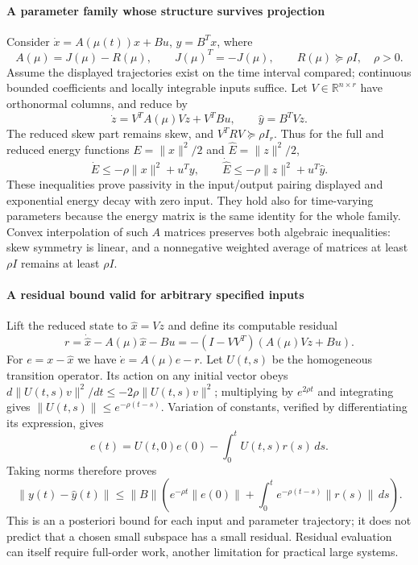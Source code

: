 \documentclass[11pt]{article}
\begin{document}
\paragraph{A parameter family whose structure survives projection}
Consider $\dot x=A(\mu(t))x+Bu$, $y=B^Tx$, where
\[
 A(\mu)=J(\mu)-R(\mu),\qquad J(\mu)^T=-J(\mu),\qquad R(\mu)\succeq\rho I,
 \quad\rho>0.
\]
Assume the displayed trajectories exist on the time interval compared; continuous bounded coefficients and locally integrable inputs suffice. Let $V\in\mathbb R^{n\times r}$ have orthonormal columns, and reduce by
\[
 \dot z=V^TA(\mu)Vz+V^TBu,\qquad \widehat y=B^TVz.
\]
The reduced skew part remains skew, and $V^TRV\succeq\rho I_r$. Thus for the full and reduced energy functions $E=\lVert x\rVert^2/2$ and $\widehat E=\lVert z\rVert^2/2$,
\[
 \dot E\leq-\rho\lVert x\rVert^2+u^Ty,
 \qquad \dot{\widehat E}\leq-\rho\lVert z\rVert^2+u^T\widehat y.
\]
These inequalities prove passivity in the input/output pairing displayed and exponential energy decay with zero input. They hold also for time-varying parameters because the energy matrix is the same identity for the whole family. Convex interpolation of such $A$ matrices preserves both algebraic inequalities: skew symmetry is linear, and a nonnegative weighted average of matrices at least $\rho I$ remains at least $\rho I$.

\paragraph{A residual bound valid for arbitrary specified inputs}
Lift the reduced state to $\widehat x=Vz$ and define its computable residual
\[
 r=\dot{\widehat x}-A(\mu)\widehat x-Bu
   =-(I-VV^T)(A(\mu)Vz+Bu).
\]
For $e=x-\widehat x$ we have $\dot e=A(\mu)e-r$. Let $U(t,s)$ be the homogeneous transition operator. Its action on any initial vector obeys
$d\lVert U(t,s)v\rVert^2/dt\leq-2\rho\lVert U(t,s)v\rVert^2$;
multiplying by $e^{2\rho t}$ and integrating gives $\lVert U(t,s)\rVert\leq e^{-\rho(t-s)}$. Variation of constants, verified by differentiating its expression, gives
\[
 e(t)=U(t,0)e(0)-\int_0^tU(t,s)r(s)\,ds.
\]
Taking norms therefore proves
\[
 \lVert y(t)-\widehat y(t)\rVert
 \leq\lVert B\rVert\left(e^{-\rho t}\lVert e(0)\rVert+
       \int_0^te^{-\rho(t-s)}\lVert r(s)\rVert\,ds\right).
 \tag{1}
\]
This is an a posteriori bound for each input and parameter trajectory; it does not predict that a chosen small subspace has a small residual. Residual evaluation can itself require full-order work, another limitation for practical large systems.
\end{document}
